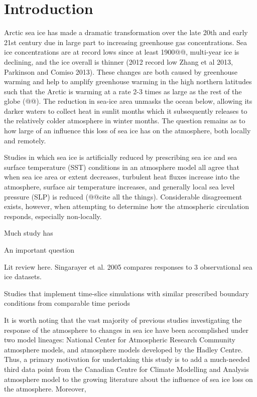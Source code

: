 \documentclass[twocol]{ametsoc}
\begin{document}
\section{Introduction}

Arctic sea ice has made a dramatic transformation over the late 20th and early 21st century due in large part to increasing greenhouse gas concentrations. Sea ice concentrations are at record lows since at least 1900@@, multi-year ice is declining, and the ice overall is thinner (2012 record low Zhang et al 2013, Parkinson and Comiso 2013). These changes are both caused by greenhouse warming and help to amplify greenhouse warming in the high northern latitudes such that the Arctic is warming at a rate 2-3 times as large as the rest of the globe (@@). The reduction in sea-ice area unmasks the ocean below, allowing its darker waters to collect heat in sunlit months which it subsequently releases to the relatively colder atmosphere in winter months. The question remains as to how large of an influence this loss of sea ice has on the atmosphere, both locally and remotely. %

Studies in which sea ice is artificially reduced by prescribing sea ice and sea surface temperature (SST) conditions in an atmosphere model all agree that when sea ice area or extent decreases, turbulent heat fluxes increase into the atmosphere, surface air temperature increases, and generally local sea level pressure (SLP) is reduced (@@cite all the things). Considerable disagreement exists, however, when attempting to determine how the atmospheric circulation responds, especially non-locally. 

Much study has 

An important question

Lit review here. Singarayer et al. 2005 compares responses to 3 observational sea ice datasets.

Studies that implement time-slice simulations with similar prescribed boundary conditions from comparable time periods 

It is worth noting that the vast majority of previous studies investigating the response of the atmosphere to changes in sea ice have been accomplished under two model lineages: National Center for Atmospheric Research Community atmosphere models, and atmosphere models developed by the Hadley Centre. Thus, a primary motivation for undertaking this study is to add a much-needed third data point from the Canadian Centre for Climate Modelling and Analysis atmosphere model to the growing literature about the influence of sea ice loss on the atmosphere. Moreover, 
\end{document}
